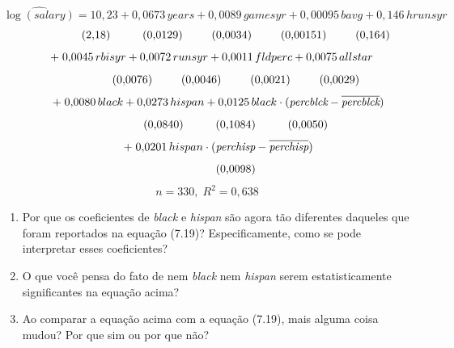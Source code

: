 \documentclass[12pt,letterpaper, onecolumn]{exam}
\begin{document}
\begin{questions}
\[
\widehat{\log(salary)} = 10{,}23 + 0{,}0673\,years + 0{,}0089\,gamesyr + 0{,}00095\,bavg + 0{,}146\,hrunsyr
\]
\[
\hspace{1.8cm} (2{,}18)\hspace{1.0cm}(0{,}0129)\hspace{0.9cm}(0{,}0034)\hspace{0.9cm}(0{,}00151)\hspace{0.9cm}(0{,}164)
\]
\[
\hspace{0.3cm} +\; 0{,}0045\,rbisyr + 0{,}0072\,runsyr + 0{,}0011\,fldperc + 0{,}0075\,allstar
\]
\[
\hspace{1.8cm} (0{,}0076)\hspace{0.9cm}(0{,}0046)\hspace{0.9cm}(0{,}0021)\hspace{0.9cm}(0{,}0029)
\]
\[
\hspace{0.7cm} +\; 0{,}0080\,black + 0{,}0273\,hispan + 0{,}0125\,black \cdot (\textit{percblck} - \overline{\textit{percblck}})
\]
\[
\hspace{1.8cm} (0{,}0840)\hspace{1.0cm}(0{,}1084)\hspace{1.0cm}(0{,}0050)
\]
\[
\hspace{0.7cm} +\; 0{,}0201\,hispan \cdot (\textit{perchisp} - \overline{\textit{perchisp}})
\]
\[
\hspace{1.8cm} (0{,}0098)
\]
\[
n = 330,\; R^2 = 0{,}638
\]

\begin{enumerate}[label=(\roman*)]
    \item Por que os coeficientes de \textit{black} e \textit{hispan} são agora tão diferentes daqueles que foram reportados na equação (7.19)? Especificamente, como se pode interpretar esses coeficientes?
    \item O que você pensa do fato de nem \textit{black} nem \textit{hispan} serem estatisticamente significantes na equação acima?
    \item Ao comparar a equação acima com a equação (7.19), mais alguma coisa mudou? Por que sim ou por que não?
\end{enumerate}

\vspace{0.7cm}


\end{questions}
\end{document}
